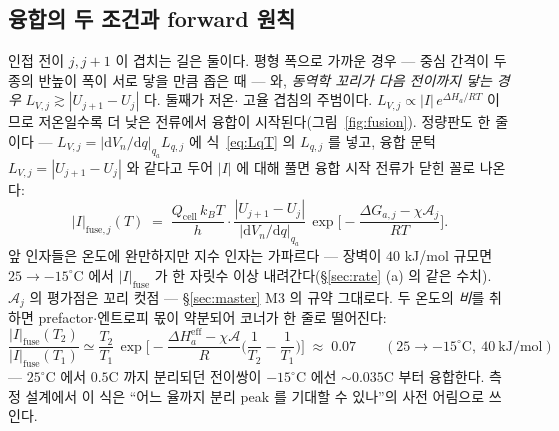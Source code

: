 \documentclass[11pt,a4paper]{article}
\newcommand{\dd}{\mathrm{d}}
\newcommand{\eff}{\mathrm{eff}}
\newcommand{\cell}{\mathrm{cell}}
\begin{document}
\subsection{융합의 두 조건과 forward 원칙}
인접 전이 $j,j{+}1$ 이 겹치는 길은 둘이다. 평형 폭으로 가까운 경우 — 중심 간격이 두 종의 반높이 폭이
서로 닿을 만큼 좁은 때 — 와, \emph{동역학 꼬리가 다음 전이까지 닿는 경우}
$L_{V,j}\gtrsim|U_{j+1}-U_j|$ 다. 둘째가 저온$\cdot$
고율 겹침의 주범이다. $L_{V,j}\propto|I|\,e^{\Delta H_a/RT}$ 이므로 저온일수록 더 낮은 전류에서 융합이
시작된다(그림~\ref{fig:fusion}). 정량판도 한 줄이다 — $L_{V,j}=|\dd V_n/\dd q|_{q_a}L_{q,j}$ 에
식~\eqref{eq:LqT} 의 $L_{q,j}$ 를 넣고, 융합 문턱 $L_{V,j}=|U_{j+1}-U_j|$ 와 같다고 두어 $|I|$ 에
대해 풀면 융합 시작 전류가 닫힌 꼴로 나온다:
\begin{equation}
|I|_{\text{fuse},j}(T)\;=\;\frac{Q_\cell\,k_BT}{h}\cdot
\frac{|U_{j+1}-U_j|}{|\dd V_n/\dd q|_{q_a}}\,
\exp\!\Big[-\frac{\Delta G_{a,j}-\chi\mathcal A_j}{RT}\Big].
\label{eq:Ifuse}
\end{equation}
앞 인자들은 온도에 완만하지만 지수 인자는 가파르다 — 장벽이 $40$ kJ/mol 규모면 $25\to-15^\circ$C
에서 $|I|_{\text{fuse}}$ 가 한 자릿수 이상 내려간다(\S\ref{sec:rate} (a) 의 같은 수치). $\mathcal A_j$ 의
평가점은 꼬리 컷점 — \S\ref{sec:master} M3 의 규약 그대로다. 두 온도의 \emph{비}를 취하면
prefactor$\cdot$엔트로피 몫이 약분되어 코너가 한 줄로 떨어진다:
\begin{equation*}
\frac{|I|_{\text{fuse}}(T_2)}{|I|_{\text{fuse}}(T_1)}
\simeq\frac{T_2}{T_1}\,
\exp\!\Big[-\frac{\Delta H_a^{\eff}-\chi\mathcal A}{R}\Big(\frac1{T_2}-\frac1{T_1}\Big)\Big]
\;\approx\;0.07\qquad(25\to-15^\circ\mathrm C,\ 40\ \mathrm{kJ/mol})
\end{equation*}
— $25^\circ$C 에서 $0.5$C 까지 분리되던 전이쌍이 $-15^\circ$C 에선 $\sim0.035$C 부터 융합한다.
측정 설계에서 이 식은 ``어느 율까지 분리 peak 를 기대할 수 있나''의 사전 어림으로 쓰인다.
\end{document}
